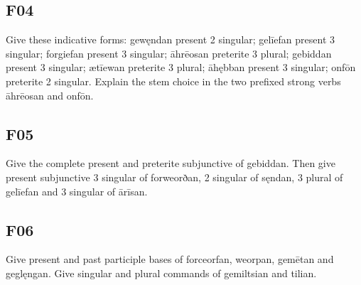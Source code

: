 \par\begin{minipage}{\linewidth}\raggedright
\subsection*{F04}

Give these indicative forms: gewęndan present 2 singular; gelīefan present 3 singular; forgiefan present 3 singular; āhrēosan preterite 3 plural; gebiddan present 3 singular; ætīewan preterite 3 plural; āhębban present 3 singular; onfōn preterite 2 singular. Explain the stem choice in the two prefixed strong verbs āhrēosan and onfōn.

\end{minipage}\par\addvspace{4pt}

\par\begin{minipage}{\linewidth}\raggedright
\subsection*{F05}

Give the complete present and preterite subjunctive of gebiddan. Then give present subjunctive 3 singular of forweorðan, 2 singular of sęndan, 3 plural of gelīefan and 3 singular of ārīsan.

\end{minipage}\par\addvspace{4pt}

\par\begin{minipage}{\linewidth}\raggedright
\subsection*{F06}

Give present and past participle bases of forceorfan, weorpan, gemētan and geglęngan. Give singular and plural commands of gemiltsian and tilian.

\end{minipage}\par\addvspace{4pt}

